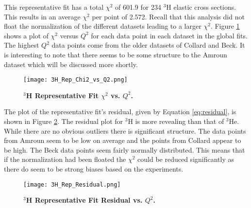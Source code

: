 
This representative fit has a total $\chi^2$ of 601.9 for 234 $^3$H elastic cross sections. This results in an average $\chi^2$ per point of 2.572. Recall that this analysis did not float the normalization of the different datasets leading to a larger $\chi^2$. Figure \ref{fig:3h_rep_fit_chi2_q2} shows a plot of $\chi^2$ versus $Q^2$ for each data point in each dataset in the global fits. The highest $Q^2$ data points come from the older datasets of Collard and Beck. It is interesting to note that there seems to be some structure to the Amroun dataset which will be discussed more shortly. 

\begin{figure}[!ht]
	\begin{center}
	\texttt{[image: 3H\_Rep\_Chi2\_vs\_Q2.png]}
	\end{center}
	\caption[$^3$H Representative Fit $\chi^2$ vs. $Q^2$]{
	{\bf{$^3$H Representative Fit $\chi^2$ vs. $Q^2$.}} }
	\label{fig:3h_rep_fit_chi2_q2}
\end{figure}

The plot of the representative fit's residual, given by Equation \ref{eq:residual}, is shown in Figure \ref{fig:3h_rep_fit_residual}. The residual plot for $^3$H is more revealing than that of $^3$He. While there are no obvious outliers there is significant structure. The data points from Amroun seem to be low on average and the points from Collard appear to be high. The Beck data points seem fairly normally distributed. This means that if the normalization had been floated the $\chi^2$ could be reduced significantly as there do seem to be strong biases based on the experiments. 

\begin{figure}[!ht]
	\begin{center}
	\texttt{[image: 3H\_Rep\_Residual.png]}
	\end{center}
	\caption[$^3$H Representative Fit Residual vs. $Q^2$]{
	{\bf{$^3$H Representative Fit Residual vs. $Q^2$.}} }
	\label{fig:3h_rep_fit_residual}
\end{figure}

